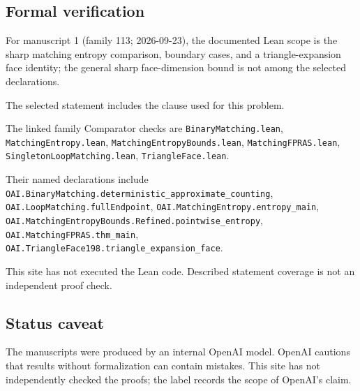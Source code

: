 \documentclass[11pt]{article}
\begin{document}
\subsection{Formal verification}
For manuscript 1 (family 113; 2026-09-23), the documented Lean scope is the sharp matching entropy comparison, boundary cases, and a triangle-expansion face identity; the general sharp face-dimension bound is not among the selected declarations.

The selected statement includes the clause used for this problem.

The linked family Comparator checks are \texttt{BinaryMatching.lean}, \texttt{MatchingEntropy.lean}, \texttt{MatchingEntropyBounds.lean}, \texttt{MatchingFPRAS.lean}, \texttt{SingletonLoopMatching.lean}, \texttt{TriangleFace.lean}.

Their named declarations include \texttt{OAI.BinaryMatching.deterministic\_approximate\_counting}, \texttt{OAI.LoopMatching.fullEndpoint}, \texttt{OAI.MatchingEntropy.entropy\_main}, \texttt{OAI.MatchingEntropyBounds.Refined.pointwise\_entropy}, \texttt{OAI.MatchingFPRAS.thm\_main}, \texttt{OAI.TriangleFace198.triangle\_expansion\_face}.

This site has not executed the Lean code. Described statement coverage is not an independent proof check.

\subsection{Status caveat}
The manuscripts were produced by an internal OpenAI model. OpenAI cautions that results without formalization can contain mistakes. This site has not independently checked the proofs; the label records the scope of OpenAI's claim.
\end{document}
